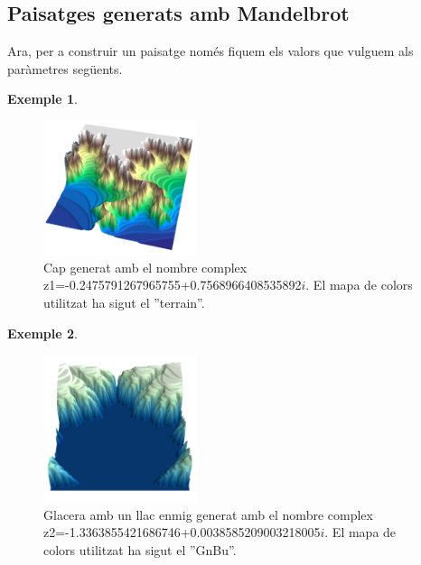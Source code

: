 \documentclass[12pt,a4paper]{report}
\newtheorem{eje}{Exemple}[chapter]
\begin{document}
\subsection{Paisatges generats amb Mandelbrot}

{
}

Ara, per a construir un paisatge només fiquem els valors que vulguem als paràmetres següents.

\begin{eje}\hspace{0cm}
{
}
\end{eje}

\begin{figure}[!ht]
\centering
\includegraphics[width=0.4\textwidth]{img/mandelbrot_muntanya.png}
\caption{Cap generat amb el nombre complex z1=-0.2475791267965755+0.7568966408535892$i$. El mapa de colors utilitzat ha sigut el ''terrain''.}
\end{figure}
\newpage
\begin{eje}\hspace{0cm}
{
}
\end{eje}

\begin{figure}[!ht]
\centering
\includegraphics[width=0.4\textwidth]{img/mandelbrot_glacera.png}
\caption{Glacera amb un llac enmig generat amb el nombre complex z2=-1.3363855421686746+0.0038585209003218005$i$. El mapa de colors utilitzat ha sigut el ''GnBu''.}
\end{figure}
\newpage
\end{document}

